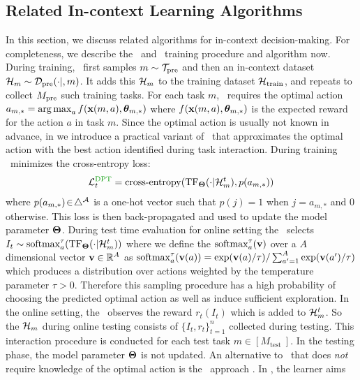 \documentclass[10pt]{article}
\theoremstyle{plain}
\theoremstyle{definition}
\theoremstyle{remark}
\begin{document}
\subsection{Related In-context Learning Algorithms}
\label{sec:prelim-dpt}
\vspace*{-0.5em}
In this section, we discuss related algorithms for in-context decision-making.
For completeness, we describe the \dpt\ and \ad\ training procedure and algorithm now.
During training, \dpt\ first samples $m\sim\mathcal{T}_{\text{pre}}$ and then an in-context dataset $\mathcal{H}_m\sim \mathcal{D}_{\text{pre}}(\cdot|,m)$. It adds this $\mathcal{H}_m$ to the training dataset $\mathcal{H}_{\text{train}}$, and repeats to collect $M_{\text{pre}}$ such training tasks.
For each task $m$, \dpt\  requires the optimal action $a_{m,*} = \mathop{\rm arg\,max}_a f(\mathbf{x}(m, a),  \boldsymbol{\theta}_{m, *})$ where $ f(\mathbf{x}(m, a),  \boldsymbol{\theta}_{m, *})$ is the expected reward for the action $a$ in task $m$.
Since the optimal action is usually not known in advance, in  we introduce a practical variant of \dpt\  that approximates the optimal action with the best action identified during task interaction.
During training \dpt\ minimizes the cross-entropy loss:
\begin{align}
    \L^{\mathrm{\dpt}}_t = \operatorname{cross-entropy}(\T_{\bTheta}(\cdot|\H_m^t), p({a}_{m,*})) \label{eq:loss-dptg}
\end{align}
where $p({a}_{m,*})\!\in \!\triangle^{\mathcal{A}}$ is a one-hot vector such that $p(j) \!=\! 1$ when $j\!=\!{a}_{m,*}$ and $0$ otherwise. This loss is then back-propagated and used to update the model parameter $\mathbf{\Theta}$.
During test time evaluation for online setting the \dpt\ selects $I_t \sim \mathrm{softmax}^\tau_a(\mathrm{TF}_{\mathbf{\Theta}}(\cdot|\mathcal{H}^t_m))$ where we define the $\mathrm{softmax}^\tau_a(\mathbf{v})$ over a $A$ dimensional vector $\mathbf{v}\in \mathbb{R}^A$ as $ \mathrm{softmax}^\tau_a(\mathbf{v}(a)) = \exp(\mathbf{v}(a)/\tau)/\sum_{a'=1}^A \exp(\mathbf{v}(a')/\tau)$ which produces a distribution over actions weighted by the temperature parameter $\tau > 0$. Therefore this sampling procedure has a high probability of choosing the predicted optimal action as well as induce sufficient exploration.
In the online setting, the \dpt\ observes the reward $r_t(I_t)$ which is added to $\mathcal{H}^t_m$. So the $\mathcal{H}_m$ during online testing consists of $\{I_t, r_t\}_{t=1}^n$ collected during testing. This interaction procedure is conducted for each test task $m\in [M_{\text {test }}]$.
In the testing phase, the model parameter $\mathbf{\Theta}$ is not updated.
An alternative to \dpt\ that does \textit{not} require knowledge of the optimal action is the \ad\ approach \citep{laskin2022context, lu2023structured}. In \ad, the learner aims
\end{document}
